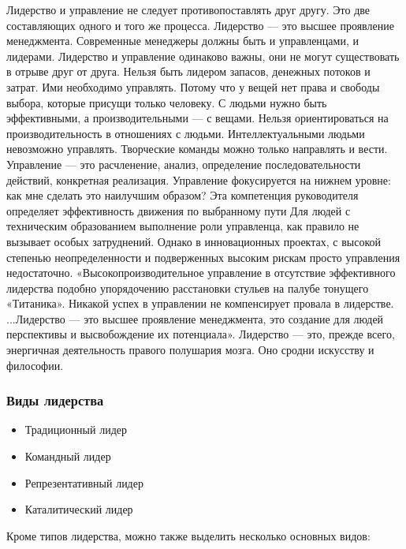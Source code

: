 \documentclass{../industrial-development}
\begin{document}
Лидерство  и управление не следует противопоставлять друг другу. Это две составляющих одного и того же процесса. Лидерство — это высшее проявление менеджмента. Современные менеджеры должны быть и управленцами, и лидерами. Лидерство и управление одинаково важны, они не могут существовать в отрыве друг от друга. Нельзя быть лидером запасов, денежных потоков и затрат. Ими необходимо управлять. Потому что у вещей нет права и свободы выбора, которые присущи только человеку. С людьми нужно быть эффективными, а производительными — с вещами. Нельзя ориентироваться на производительность в отношениях с людьми. Интеллектуальными людьми невозможно управлять. Творческие команды можно только направлять и вести.
Управление — это расчленение, анализ, определение последовательности действий, конкретная реализация. Управление фокусируется на нижнем уровне: как мне сделать это наилучшим образом? Эта компетенция руководителя определяет эффективность движения по выбранному пути
Для людей с техническим образованием выполнение роли управленца, как правило не вызывает особых затруднений.
Однако в инновационных проектах, с высокой степенью неопределенности и подверженных высоким рискам просто управления недостаточно. «Высокопроизводительное управление в отсутствие эффективного лидерства подобно упорядочению расстановки стульев на палубе тонущего «Титаника». Никакой успех в управлении не компенсирует провала в лидерстве. ...Лидерство — это высшее проявление менеджмента, это создание для людей перспективы и высвобождение их потенциала». Лидерство — это, прежде всего, энергичная деятельность правого полушария мозга. Оно сродни искусству и философии. 
\begin{frame} \frametitle{Виды лидерства}
  \begin{itemize}
  \item Традиционный лидер
  \item Командный лидер
  \item Репрезентативный лидер
  \item Каталитический лидер
  \end{itemize}
\end{frame}

\lecturenotes

Кроме типов лидерства, можно также выделить несколько основных видов:
\end{document}
